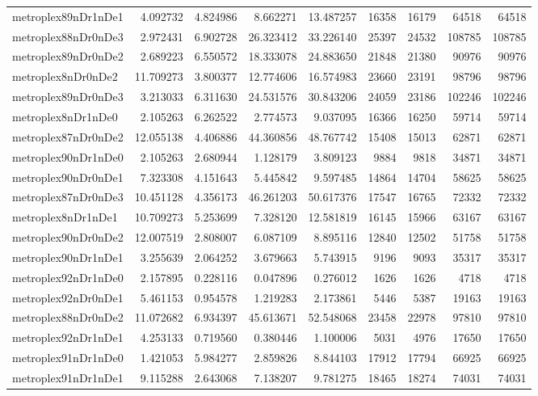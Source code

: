 \begin{longtable}{|l|r|r|r|r|r|r|r|r|}
metroplex89nDr1nDe1 & 4.092732 & 4.824986 & 8.662271 & 13.487257 & 16358 & 16179 & 64518 & 64518 \\
metroplex88nDr0nDe3 & 2.972431 & 6.902728 & 26.323412 & 33.226140 & 25397 & 24532 & 108785 & 108785 \\
metroplex89nDr0nDe2 & 2.689223 & 6.550572 & 18.333078 & 24.883650 & 21848 & 21380 & 90976 & 90976 \\
metroplex8nDr0nDe2 & 11.709273 & 3.800377 & 12.774606 & 16.574983 & 23660 & 23191 & 98796 & 98796 \\
metroplex89nDr0nDe3 & 3.213033 & 6.311630 & 24.531576 & 30.843206 & 24059 & 23186 & 102246 & 102246 \\
metroplex8nDr1nDe0 & 2.105263 & 6.262522 & 2.774573 & 9.037095 & 16366 & 16250 & 59714 & 59714 \\
metroplex87nDr0nDe2 & 12.055138 & 4.406886 & 44.360856 & 48.767742 & 15408 & 15013 & 62871 & 62871 \\
metroplex90nDr1nDe0 & 2.105263 & 2.680944 & 1.128179 & 3.809123 & 9884 & 9818 & 34871 & 34871 \\
metroplex90nDr0nDe1 & 7.323308 & 4.151643 & 5.445842 & 9.597485 & 14864 & 14704 & 58625 & 58625 \\
metroplex87nDr0nDe3 & 10.451128 & 4.356173 & 46.261203 & 50.617376 & 17547 & 16765 & 72332 & 72332 \\
metroplex8nDr1nDe1 & 10.709273 & 5.253699 & 7.328120 & 12.581819 & 16145 & 15966 & 63167 & 63167 \\
metroplex90nDr0nDe2 & 12.007519 & 2.808007 & 6.087109 & 8.895116 & 12840 & 12502 & 51758 & 51758 \\
metroplex90nDr1nDe1 & 3.255639 & 2.064252 & 3.679663 & 5.743915 & 9196 & 9093 & 35317 & 35317 \\
metroplex92nDr1nDe0 & 2.157895 & 0.228116 & 0.047896 & 0.276012 & 1626 & 1626 & 4718 & 4718 \\
metroplex92nDr0nDe1 & 5.461153 & 0.954578 & 1.219283 & 2.173861 & 5446 & 5387 & 19163 & 19163 \\
metroplex88nDr0nDe2 & 11.072682 & 6.934397 & 45.613671 & 52.548068 & 23458 & 22978 & 97810 & 97810 \\
metroplex92nDr1nDe1 & 4.253133 & 0.719560 & 0.380446 & 1.100006 & 5031 & 4976 & 17650 & 17650 \\
metroplex91nDr1nDe0 & 1.421053 & 5.984277 & 2.859826 & 8.844103 & 17912 & 17794 & 66925 & 66925 \\
metroplex91nDr1nDe1 & 9.115288 & 2.643068 & 7.138207 & 9.781275 & 18465 & 18274 & 74031 & 74031 \\

\end{longtable}
